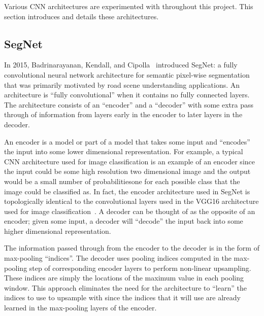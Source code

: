 Various CNN architectures are experimented with throughout this project. This section introduces and details these architectures.

\subsection{SegNet}

In 2015, Badrinarayanan, Kendall, and Cipolla~\cite{segnet} introduced SegNet: a fully convolutional neural network architecture for semantic pixel-wise segmentation that was primarily motivated by road scene understanding applications. An architecture is ``fully convolutional'' when it contains no fully connected layers. The architecture consists of an ``encoder'' and a ``decoder'' with some extra pass through of information from layers early in the encoder to later layers in the decoder.

An encoder is a model or part of a model that takes some input and ``encodes'' the input into some lower dimensional representation. For example, a typical CNN architecture used for image classification is an example of an encoder since the input could be some high resolution two dimensional image and the output would be a small number of probabilities\textemdash one for each possible class that the image could be classified as. In fact, the encoder architecture used in SegNet is topologically identical to the convolutional layers used in the VGG16 architecture used for image classification~\cite{segnet, vgg16}. A decoder can be thought of as the opposite of an encoder; given some input, a decoder will ``decode'' the input back into some higher dimensional representation.


The information passed through from the encoder to the decoder is in the form of max-pooling ``indices''. The decoder uses pooling indices computed in the max-pooling step of corresponding encoder layers to perform non-linear upsampling. These indices are simply the locations of the maximum value in each pooling window. This approach eliminates the need for the architecture to ``learn'' the indices to use to upsample with since the indices that it will use are already learned in the max-pooling layers of the encoder.

